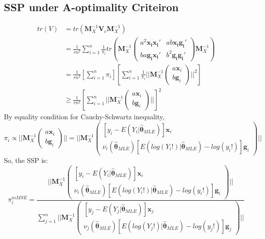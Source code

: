 \documentclass[]{article}
\begin{document}
\subsection{SSP under A-optimality Criteiron}
\begin{align*}
	tr(V) &= tr(\boldsymbol{M}_X^{-1}\boldsymbol{V}_c\boldsymbol{M}_X^{-1})\\
	&=\frac{1}{rn^2}\sum_{i=1}^{n}\frac{1}{\pi_i}tr(\boldsymbol{M}_X^{-1}\begin{pmatrix}
		a^2\boldsymbol{x_i}\boldsymbol{x_i}' &
		ab\boldsymbol{x_i}\boldsymbol{g_i}'\\
		ba\boldsymbol{g_i}\boldsymbol{x_i}' &
		b^2\boldsymbol{g_i}\boldsymbol{g_i}'
	\end{pmatrix}\boldsymbol{M}_X^{-1})\\
	&=\frac{1}{rn^2}[\sum_{i=1}^{n}\pi_i][\sum_{i=1}^{n}\frac{1}{\pi_i}||\boldsymbol{M}_X^{-1}\begin{pmatrix}
		a\boldsymbol{x}_i\\b\boldsymbol{g}_i
	\end{pmatrix}||^2]\\
	&\geq\frac{1}{rn^2}[\sum_{i=1}^{n}||\boldsymbol{M}_X^{-1}\begin{pmatrix}
		a\boldsymbol{x}_i\\b\boldsymbol{g}_i
	\end{pmatrix}||]^2
\end{align*}
By equality condition for Cauchy-Schwartz inequality, $\pi_i \propto  ||\boldsymbol{M}_X^{-1}\begin{pmatrix}
	a\boldsymbol{x}_i\\b\boldsymbol{g}_i
\end{pmatrix}|| =||\boldsymbol{M}_X^{-1}\begin{pmatrix}
	[y_i - E(Y_i| \hat{\boldsymbol{\theta}}_{MLE})]\boldsymbol{x}_i\\
	\nu_i(\hat{\boldsymbol{\theta}}_{MLE})[E(log(Y_i!)| \hat{\boldsymbol{\theta}}_{MLE}) - log(y_i!)]\boldsymbol{g}_i
\end{pmatrix}||$
So, the SSP is:
$$
\pi_i^{mMSE} = \frac{||\boldsymbol{M}_X^{-1}\begin{pmatrix}
		[y_i - E(Y_i| \hat{\boldsymbol{\theta}}_{MLE})]\boldsymbol{x}_i\\
		\nu_i(\hat{\boldsymbol{\theta}}_{MLE})[E(log(Y_i!)| \hat{\boldsymbol{\theta}}_{MLE}) - log(y_i!)]\boldsymbol{g}_i
	\end{pmatrix}||}{\sum_{j=1}^{n}||\boldsymbol{M}_X^{-1}\begin{pmatrix}
	[y_j - E(Y_j| \hat{\boldsymbol{\theta}}_{MLE})]\boldsymbol{x}_j\\
	\nu_j(\hat{\boldsymbol{\theta}}_{MLE})[E(log(Y_j!)| \hat{\boldsymbol{\theta}}_{MLE}) - log(y_j!)]\boldsymbol{g}_j
\end{pmatrix}||}
$$
\end{document}
